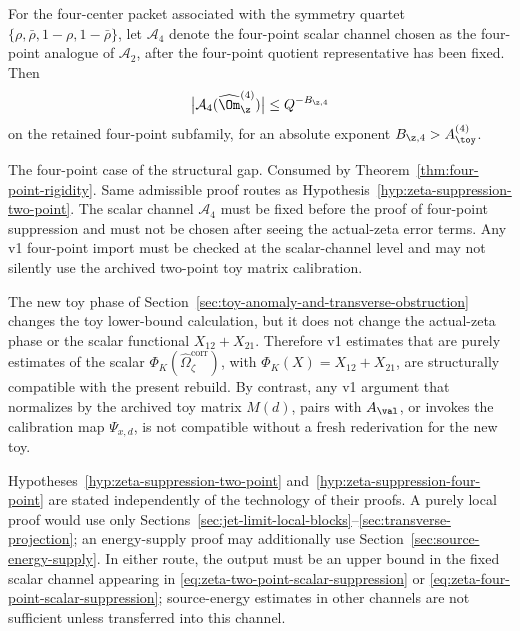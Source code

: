 \begin{hypothesis}
\label{hyp:zeta-suppression-four-point}
For the four-center packet associated with the symmetry quartet
\(\{\rho,\bar\rho,1-\rho,1-\bar\rho\}\), let
\(\mathcal A_4\) denote the four-point scalar channel chosen as the
four-point analogue of \(\mathcal A_2\), after the four-point quotient
representative has been fixed.  Then
\begin{equation}
\label{eq:zeta-four-point-scalar-suppression}
        \bigl|\mathcal A_4(\widehat\Om_\z^{(4)})\bigr|
        \le Q^{-B_{\z,4}}
\end{equation}
on the retained four-point subfamily, for an absolute exponent
\(B_{\z,4}>A_\toy^{(4)}\).
\end{hypothesis}

\begin{wip}\label{rem:wip-zeta-suppression-four-point}
The four-point case of the structural gap.  Consumed by
Theorem~\ref{thm:four-point-rigidity}.  Same admissible proof routes
as Hypothesis~\ref{hyp:zeta-suppression-two-point}.  The scalar channel
\(\mathcal A_4\) must be fixed before the proof of four-point
suppression and must not be chosen after seeing the actual-zeta error
terms.  Any v1 four-point import must be checked at the scalar-channel
level and may not silently use the archived two-point toy matrix
calibration.
\end{wip}

\begin{remark}
\label{rem:safe-scalar-import-from-v1}
The new toy phase of Section~\ref{sec:toy-anomaly-and-transverse-obstruction}
changes the toy lower-bound calculation, but it does not change the
actual-zeta phase or the scalar functional \(X_{12}+X_{21}\).  Therefore
v1 estimates that are purely estimates of the scalar
\(\Phi_K(\widehat\Omega_\zeta^{\mathrm{corr}})\), with
\(\Phi_K(X)=X_{12}+X_{21}\), are structurally compatible with the
present rebuild.  By contrast, any v1 argument that normalizes by the
archived toy matrix \(M(d)\), pairs with \(A_{\val}\), or invokes the
calibration map \(\Psi_{x,d}\), is not compatible without a fresh
rederivation for the new toy.
\end{remark}

\begin{remark}
\label{rem:standalone-and-energy-supply-routes}
Hypotheses~\ref{hyp:zeta-suppression-two-point}
and~\ref{hyp:zeta-suppression-four-point} are stated independently of
the technology of their proofs.  A purely local proof would use only
Sections~\ref{sec:jet-limit-local-blocks}--\ref{sec:transverse-projection};
an energy-supply proof may additionally use
Section~\ref{sec:source-energy-supply}.  In either route, the output must
be an upper bound in the fixed scalar channel appearing in
\eqref{eq:zeta-two-point-scalar-suppression} or
\eqref{eq:zeta-four-point-scalar-suppression}; source-energy estimates in
other channels are not sufficient unless transferred into this channel.
\end{remark}
